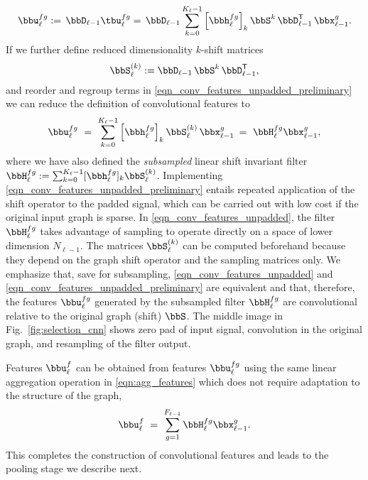 % 
\begin{equation} \label{eqn_conv_features_unpadded_preliminary}
   \bbu_{\ell}^{fg}
     := \, \bbD_{\ell-1} \tbu_{\ell}^{fg} 
	  = \, \bbD_{\ell-1}
	       \sum_{k=0}^{K_{\ell}-1} 
	               \Big[ \bbh_{\ell}^{fg} \Big]_{k} \,
	               \bbS^{k} \,
	               \bbD_{\ell-1}^{\Tr} \,
	               \bbx_{\ell-1}^{g} .
\end{equation}
%
If we further define reduced dimensionality $k$-shift matrices 
% 
\begin{equation} \label{eqn_gsp_unpadded_powers}
   \bbS_{\ell}^{(k)} :=  \bbD_{\ell-1}\, \bbS^{k}\,\bbD_{\ell-1}^{\Tr},
\end{equation}
%
and reorder and regroup terms in \eqref{eqn_conv_features_unpadded_preliminary} we can reduce the definition of convolutional features to 
% 
\begin{equation} \label{eqn_conv_features_unpadded}
   \bbu_{\ell}^{fg}
	\ =  \ \sum_{k=0}^{K_{\ell}-1} 
	             \Big[ \bbh_{\ell}^{fg} \Big]_{k} \,
	             \bbS_{\ell}^{(k)}\,
	             \bbx_{\ell-1}^{g} 
	\:=  \ \bbH_{\ell}^{fg} \bbx_{\ell-1}^{g} ,
\end{equation}
%
where we have also defined the \textit{subsampled} linear shift invariant filter $\bbH_{\ell}^{fg} :=  \sum_{k=0}^{K_{\ell}-1} [\bbh_{\ell}^{fg}]_{k}\bbS_{\ell}^{(k)}$. Implementing \eqref{eqn_conv_features_unpadded_preliminary} entails repeated application of the shift operator to the padded signal, which can be carried out with low cost if the original input graph is sparse. In \eqref{eqn_conv_features_unpadded}, the filter $\bbH_{\ell}^{fg}$ takes advantage of sampling to operate directly on a space of lower dimension $N_{\ell-1}$. The matrices $\bbS_{\ell}^{(k)}$ can be computed beforehand because they depend on the graph shift operator and the sampling matrices only. We emphasize that, save for subsampling, \eqref{eqn_conv_features_unpadded} and \eqref{eqn_conv_features_unpadded_preliminary} are equivalent and that, therefore, the features $\bbu_{\ell}^{fg}$ generated by the subsampled filter $\bbH_{\ell}^{fg}$ are convolutional relative to the original graph (shift) $\bbS$. The middle image in Fig.~\ref{fig:selection_cnn} shows zero pad of input signal, convolution in the original graph, and resampling of the filter output.

Features $\bbu_{\ell}^{f}$ can be obtained from features $\bbu_{\ell}^{fg}$ using the same linear aggregation operation in \eqref{eqn:agg_features} which does not require adaptation to the structure of the graph,
%
\begin{equation} \label{eqn_agggregated_features_graph}
   \bbu_{\ell}^{f}
	   \  =\ \sum_{g=1}^{F_{\ell-1}} \bbH_{\ell}^{fg} \bbx_{\ell-1}^{g}.
\end{equation}
%
This completes the construction of convolutional features and leads to the pooling stage we describe next.


